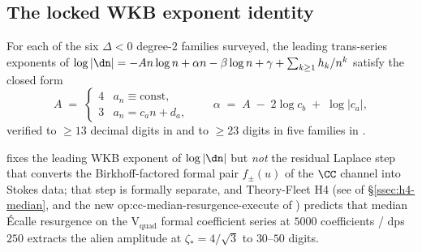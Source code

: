 
\subsection{The locked WKB exponent identity}
\label{ssec:wkb}

\begin{proposition}
\label{prop:wkb}
For each of the six $\Delta<0$ degree-$2$ families surveyed,
the leading trans-series exponents of
$\log|\dn| = -A n \log n + \alpha n - \beta \log n + \gamma
+ \sum_{k \ge 1} h_k / n^k$
satisfy the closed form
\[
  A \;=\; \begin{cases} 4 & a_n \equiv \text{const}, \\
                        3 & a_n = c_a n + d_a, \end{cases}
  \qquad
  \alpha \;=\; A \;-\; 2 \log c_b \;+\; \log|c_a|,
\]
verified to $\geq 13$ decimal digits in
\cite{siarc_borel_kscan} and to $\ge 23$ digits in
five families in \cite{siarc_cc_pipeline_f}.
\end{proposition}

 fixes the leading WKB exponent of
$\log|\dn|$ but \emph{not} the residual Laplace step that
converts the Birkhoff-factored formal pair $f_\pm(u)$ of the
$\CC$ channel into Stokes data; that step is formally
separate, and Theory-Fleet H4 (see 
of \S\ref{ssec:h4-median}, and the new
\textsf{op:cc-median-resurgence-execute} of
) predicts that median \'Ecalle resurgence
on the V$_{\mathrm{quad}}$ formal coefficient series at
$5000$ coefficients / dps $250$ extracts the alien
amplitude at $\zeta_*=4/\sqrt 3$ to $30$--$50$ digits.

